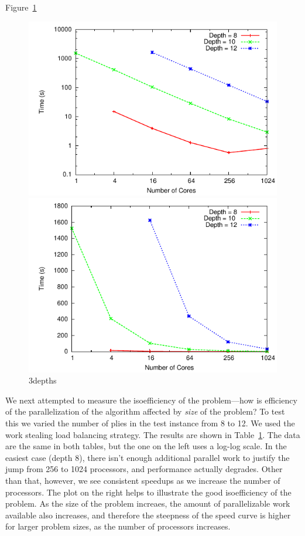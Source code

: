 \documentclass[11pt]{article}
\begin{document}
 
Figure~\ref{3depths}
\begin{figure}
\begin{minipage}{0.5\linewidth}
\centering
\includegraphics[width=\textwidth]{plots/3depths.pdf}
\end{minipage}
\begin{minipage}{0.5\linewidth}
\centering
\includegraphics[width=\textwidth]{plots/3depthsnolog.pdf}
\end{minipage}
\caption{3depths}
\label{3depths}
\end{figure}

We next attempted to measure the isoefficiency of the problem---how is efficiency of the parallelization of the
algorithm affected by {\em size} of the problem?  To test this we varied the number of plies in the test instance from
8 to 12. We used the work stealing load balancing strategy.  The results are shown in Table~\ref{3depths}.  The data are
the same in both tables, but the one on the left uses a log-log scale.  In the easiest case (depth 8), there isn't
enough additional parallel work to justify the jump from 256 to 1024 processors, and performance actually degrades.
Other than that, however, we see consistent speedups as we increase the number of processors.  The plot on the right helps to
illustrate the good isoefficiency of the problem.  As the size of the problem increaes, the amount of parallelizable
work available also increases, and therefore the steepness of the speed curve is higher for larger problem sizes, as the
number of processors increases.
 
\end{document}
